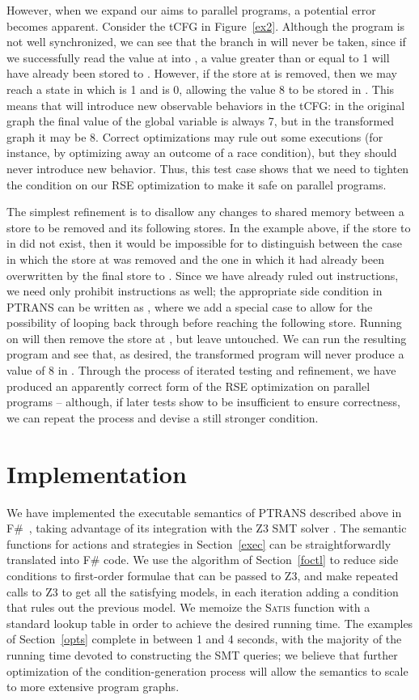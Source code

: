 \documentclass{eptcs}
\newcommand{\ptrans}[0]{PTRANS}
\begin{document}
However, when we expand our aims to parallel programs, a potential error becomes apparent. Consider the \ac{tCFG} in Figure~\ref{ex2}.
Although the program is not well synchronized, we can see that the  branch in  will never be taken, since if we successfully read the value at  into , a value greater than or equal to 1 will have already been stored to . However, if the store at  is removed, then we may reach a state in which  is 1 and  is 0, allowing the value 8 to be stored in . This means that  will introduce new observable behaviors in the \ac{tCFG}: in the original graph the final value of the global variable  is always 7, but in the transformed graph it may be 8. Correct optimizations may rule out some executions (for instance, by optimizing away an outcome of a race condition), but they should never introduce new behavior. Thus, this test case shows that we need to tighten the condition on our RSE optimization to make it safe on parallel programs.

The simplest refinement is to disallow any changes to shared memory between a store to be removed and its following stores. In the example above, if the store to  in  did not exist, then it would be impossible for  to distinguish between the case in which the store at  was removed and the one in which it had already been overwritten by the final store to . Since we have already ruled out  instructions, we need only prohibit  instructions as well; the appropriate side condition in {\ptrans} can be written as , where we add a special case to allow for the possibility of looping back through  before reaching the following store. Running  on  will then remove the store at , but leave  untouched. We can run the resulting program and see that, as desired, the transformed program will never produce a value of 8 in . Through the process of iterated testing and refinement, we have produced an apparently correct form of the RSE optimization on parallel programs -- although, if later tests show  to be insufficient to ensure correctness, we can repeat the process and devise a still stronger condition.

\section{Implementation}
\label{impl}
We have implemented the executable semantics of {\ptrans} described above in F\#~\cite{fsharp}, taking advantage of its integration with the Z3 SMT solver \cite{z3}. The semantic functions for actions and strategies in Section~\ref{exec} can be straightforwardly translated into F\# code. We use the algorithm of Section~\ref{foctl} to reduce side conditions to first-order formulae that can be passed to Z3, and make repeated calls to Z3 to get all the satisfying models, in each iteration adding a condition that rules out the previous model. We memoize the \textsc{Satis} function with a standard lookup table in order to achieve the desired running time. The examples of Section~\ref{opts} complete in between 1 and 4 seconds, with the majority of the running time devoted to constructing the SMT queries; we believe that further optimization of the condition-generation process will allow the semantics to scale to more extensive program graphs.
\end{document}
